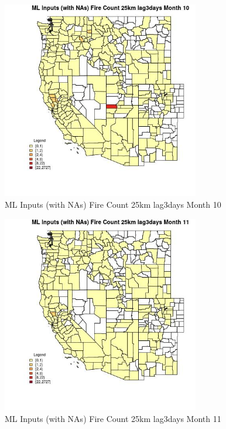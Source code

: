 \begin{figure} 
\centering  
\includegraphics[width=0.77\textwidth]{Code_Outputs/Report_ML_input_PM25_Step4_part_f_de_duplicated_aves_prioritize_24hr_obswNAs_CountyFire_Count_25km_lag3daysmedianMonth10.jpg} 
\caption{\label{fig:Report_ML_input_PM25_Step4_part_f_de_duplicated_aves_prioritize_24hr_obswNAsCountyFire_Count_25km_lag3daysmedianMonth10}ML Inputs (with NAs) Fire Count 25km lag3days Month 10} 
\end{figure} 
 

\begin{figure} 
\centering  
\includegraphics[width=0.77\textwidth]{Code_Outputs/Report_ML_input_PM25_Step4_part_f_de_duplicated_aves_prioritize_24hr_obswNAs_CountyFire_Count_25km_lag3daysmedianMonth11.jpg} 
\caption{\label{fig:Report_ML_input_PM25_Step4_part_f_de_duplicated_aves_prioritize_24hr_obswNAsCountyFire_Count_25km_lag3daysmedianMonth11}ML Inputs (with NAs) Fire Count 25km lag3days Month 11} 
\end{figure} 
 

